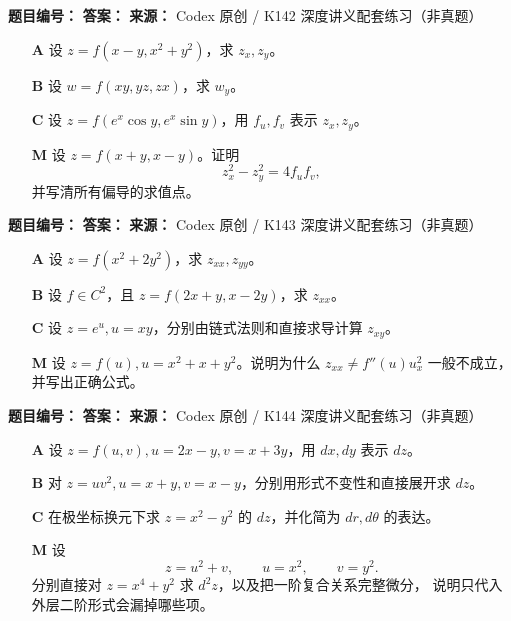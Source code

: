 \begin{problemBox}
\begin{problemMeta}
\textbf{题目编号：}  \quad
\textbf{答案：}  \quad
\textbf{来源：} Codex 原创 / K142 深度讲义配套练习（非真题）
\end{problemMeta}
\begin{enumerate}
\item[\textbf{A}] 设 \(z=f(x-y,x^2+y^2)\)，求 \(z_x,z_y\)。
\item[\textbf{B}] 设 \(w=f(xy,yz,zx)\)，求 \(w_y\)。
\item[\textbf{C}] 设 \(z=f(e^x\cos y,e^x\sin y)\)，用 \(f_u,f_v\) 表示
\(z_x,z_y\)。
\item[\textbf{M}] 设 \(z=f(x+y,x-y)\)。证明
\[
z_x^2-z_y^2=4f_u f_v,
\]
并写清所有偏导的求值点。
\end{enumerate}
\end{problemBox}

\begin{problemBox}
\begin{problemMeta}
\textbf{题目编号：}  \quad
\textbf{答案：}  \quad
\textbf{来源：} Codex 原创 / K143 深度讲义配套练习（非真题）
\end{problemMeta}
\begin{enumerate}
\item[\textbf{A}] 设 \(z=f(x^2+2y^2)\)，求 \(z_{xx},z_{yy}\)。
\item[\textbf{B}] 设 \(f\in C^2\)，且
\(z=f(2x+y,x-2y)\)，求 \(z_{xx}\)。
\item[\textbf{C}] 设 \(z=e^u,u=xy\)，分别由链式法则和直接求导计算 \(z_{xy}\)。
\item[\textbf{M}] 设 \(z=f(u),u=x^2+x+y^2\)。说明为什么
\(z_{xx}\ne f''(u)u_x^2\) 一般不成立，并写出正确公式。
\end{enumerate}
\end{problemBox}

\begin{problemBox}
\begin{problemMeta}
\textbf{题目编号：}  \quad
\textbf{答案：}  \quad
\textbf{来源：} Codex 原创 / K144 深度讲义配套练习（非真题）
\end{problemMeta}
\begin{enumerate}
\item[\textbf{A}] 设 \(z=f(u,v),u=2x-y,v=x+3y\)，用 \(dx,dy\) 表示 \(dz\)。
\item[\textbf{B}] 对 \(z=u v^2,u=x+y,v=x-y\)，分别用形式不变性和直接展开求 \(dz\)。
\item[\textbf{C}] 在极坐标换元下求 \(z=x^2-y^2\) 的 \(dz\)，并化简为
\(dr,d\theta\) 的表达。
\item[\textbf{M}] 设
\[
z=u^2+v,\qquad u=x^2,\qquad v=y^2.
\]
分别直接对 \(z=x^4+y^2\) 求 \(d^2z\)，以及把一阶复合关系完整微分，
说明只代入外层二阶形式会漏掉哪些项。
\end{enumerate}
\end{problemBox}

